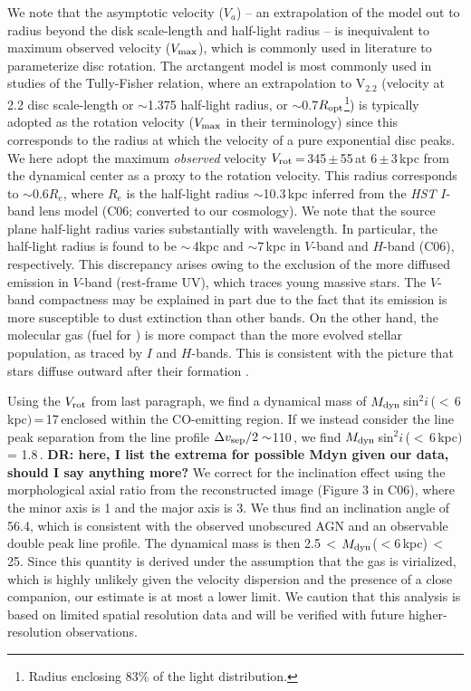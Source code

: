 \documentclass[]{emulateapj}
\begin{document}
We note that the asymptotic velocity ($V_{a}$) -- an extrapolation of the model
out to radius beyond the disk scale-length and half-light radius --
is inequivalent to maximum observed velocity ($V_{\rm max}$),
which is commonly used in literature to parameterize disc rotation.
The arctangent model is most commonly used in studies of the
Tully-Fisher relation, where an extrapolation to V$_{2.2}$ (velocity
at 2.2 disc scale-length or $\sim$1.375 half-light radius,
or $\sim$0.7$R_{\rm opt}$\footnote{Radius enclosing 83\% of the light
distribution.}) is typically adopted
as the rotation velocity ($V_{\rm max}$ in their
terminology) since this corresponds to the radius at which the velocity
of a pure exponential disc peaks.
We here adopt the maximum {\em observed} velocity
$V_{\rm rot}$\,=\,345\,$\pm$\,55\,\kms at 6\,$\pm$\,3\,kpc from the
dynamical center as a proxy to the rotation velocity.
This radius corresponds to $\sim$0.6$R_e$, where $R_e$ is the half-light
radius $\sim$10.3\,kpc inferred from the {\it HST} $I$-band
lens model (C06; converted to
our cosmology).
We note that the source plane half-light radius varies substantially with
wavelength. In particular, the half-light radius is found to be
$\sim$\,4kpc and $\sim$7\,kpc in $V$-band
\citep{Brewer08a} and $H$-band (C06), respectively.
This discrepancy arises owing to the exclusion of the more
diffused emission in $V$-band (rest-frame UV),
which traces young massive stars.
The $V$-band compactness may be explained in part
due to the fact that its emission is
more susceptible to dust extinction than other bands.
On the other hand, the molecular gas (fuel for \SF) is more compact
than the more evolved stellar population, as traced by $I$ and $H$-bands.
This is consistent with the picture that stars diffuse outward
after their formation \citep{Calzetti01a}.

Using the $V_{\rm rot}$ from last paragraph, we find a dynamical mass of
$M_{\rm dyn}$\,sin$^2 i$\,($<$\,6\,kpc$)$\,=\,17\,\Msun enclosed
within the CO-emitting region. If we instead consider the
line peak separation from the
\bco line profile $\Delta v_{\rm sep}/2 \sim$110\,\kms, we find
$M_{\rm dyn}$\,sin$^2 i$\,($<$\,6\,kpc$)$ = 1.8\,\Msun.
{\bf DR: here, I list the extrema for possible Mdyn given our data,
should I say anything more?}
We correct for the inclination effect using the
morphological axial ratio from the reconstructed image (Figure 3 in C06), where
the minor axis is 1 and the major axis is 3.
We thus find an inclination angle of 56.4\degr, which is consistent with the
observed unobscured AGN and an observable double peak line profile.
The dynamical mass is then
2.5\Msun\,$<$\,$M_{\rm dyn}$($<$6\,kpc)\,$<$\,25\Msun.
Since this quantity is derived under the assumption that the gas is
virialized, which is highly unlikely given the velocity dispersion and the
presence of a close companion, our estimate is
at most a lower limit. We caution that this analysis is
based on limited spatial
resolution data and will be verified with future higher-resolution
observations.
\end{document}
